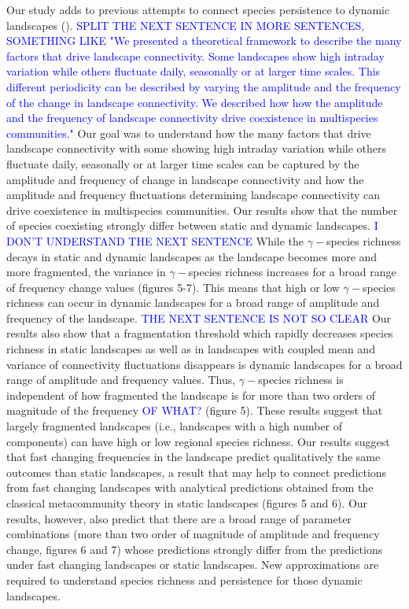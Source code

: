 \documentclass[12pt]{article}
\newcommand{\GM}[1]{\textcolor{Blue}{#1}}
\begin{document}
Our study adds to previous attempts to connect species persistence to dynamic landscapes (\cite{Hanski1999,keymeretal2000}). \GM{SPLIT THE NEXT SENTENCE IN MORE SENTENCES, SOMETHING LIKE "We presented a theoretical framework to describe the many factors that drive landscape connectivity. Some landscapes show high intraday variation while others fluctuate daily, seasonally or at larger time scales. This different periodicity can be described by varying the amplitude and the frequency of the change in landscape connectivity. We described how how the amplitude and the frequency of landscape connectivity drive coexistence in multispecies communities."} Our goal was to understand how the many factors that drive landscape connectivity with some showing high intraday variation while others fluctuate daily, seasonally or at larger time scales can be captured by the amplitude and frequency of change in landscape connectivity and how the amplitude and frequency fluctuations determining landscape connectivity can drive coexistence in multispecies communities. Our results show that the number of species coexisting strongly differ between static and dynamic landscapes. \GM{I DON'T UNDERSTAND THE NEXT SENTENCE} While the $\gamma-$species richness decays in static and dynamic landscapes as the landscape becomes more and more fragmented, the variance in $\gamma-$species richness increases for a broad range of frequency change values (figures 5-7). This means that high or low $\gamma-$species richness can occur in dynamic landscapes for a broad range of amplitude and frequency of the landscape. \GM{THE NEXT SENTENCE IS NOT SO CLEAR} Our results also show that a fragmentation threshold which rapidly decreases species richness in static landscapes as well as in landscapes with coupled mean and variance of connectivity fluctuations disappears is dynamic landscapes for a broad range of amplitude and frequency values. Thus,  $\gamma-$species richness is independent of how fragmented the landscape is for more than two orders of magnitude of the frequency \GM{OF WHAT?} (figure 5). These results suggest that largely fragmented landscapes (i.e., landscapes with a high number of components) can have high or low regional species richness. Our results suggest that fast changing frequencies in the landscape predict qualitatively the same outcomes than static landscapes, a result that may help to connect predictions from fast changing landscapes with analytical predictions obtained from the classical metacommunity theory in static landscapes (figures 5 and 6). Our results, however, also predict that there are a broad range of parameter combinations (more than two order of magnitude of amplitude and frequency change, figures 6 and 7) whose predictions strongly differ from the predictions under fast changing landscapes or static landscapes. New approximations are required to understand species richness and persistence for those dynamic landscapes. 
\end{document}
